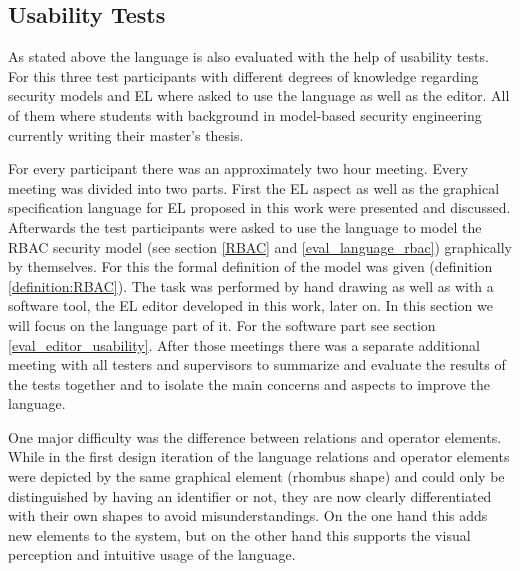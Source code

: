 \documentclass[twoside, openright, 12pt]{book}
\begin{document}
%



\subsection{Usability Tests}
\label{eval_language_usability}
As stated above the language is also evaluated with the help of usability tests.
For this three test participants with different degrees of knowledge regarding security models and EL where asked to use the language as well as the editor.
All of them where students with background in model-based security engineering currently writing their master's thesis.

For every participant there was an approximately two hour meeting.
Every meeting was divided into two parts.
First the EL aspect as well as the graphical specification language for EL proposed in this work were presented and discussed.
Afterwards the test participants were asked to use the language to model the RBAC security model (see section \ref{RBAC} and \ref{eval_language_rbac}) graphically by themselves.
For this the formal definition of the model was given (definition \ref{definition:RBAC}).
The task was performed by hand drawing as well as with a software tool, the EL editor developed in this work, later on.
In this section we will focus on the language part of it.
For the software part see section \ref{eval_editor_usability}.
After those meetings there was a separate additional meeting with all testers and supervisors to summarize and evaluate the results of the tests together and to isolate the main concerns and aspects to improve the language.

One major difficulty was the difference between relations and operator elements.
While in the first design iteration of the language relations and operator elements were depicted by the same graphical element (rhombus shape) and could only be distinguished by having an identifier or not, they are now clearly differentiated with their own shapes to avoid misunderstandings.
On the one hand this adds new elements to the system, but on the other hand this supports the visual perception and intuitive usage of the language.
\end{document}
